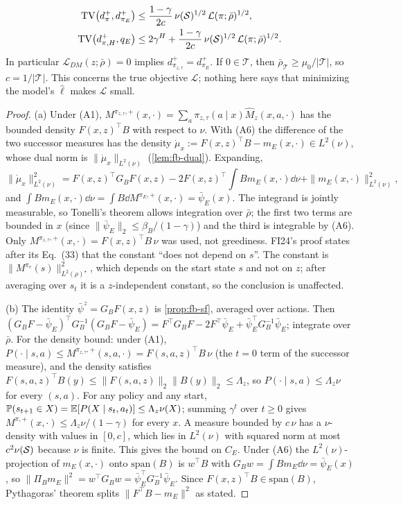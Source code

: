 \begin{theorem}
\begin{enumerate}[nosep,label=(\alph*)]
  \begin{align*}
  \mathrm{TV}\big(d^+_\pi,d^+_{\pi_E}\big)&\le\frac{1-\gamma}{2c}\,\nu(\mathcal{S})^{1/2}\,\mathcal L(\pi;\bar\rho)^{1/2},\\
  \mathrm{TV}\big(d^+_{\pi,H},q_E\big)&\le2\gamma^H+\frac{1-\gamma}{2c}\,\nu(\mathcal{S})^{1/2}\,\mathcal L(\pi;\bar\rho)^{1/2}.
  \end{align*}
  In particular $\mathcal L_{DM}(z;\bar\rho)=0$ implies $d^+_{\pi_{z,\tau}}=d^+_{\pi_E}$. If $0\in\mathcal T$, then $\bar\rho_{\mathcal T}\ge\mu_0/|\mathcal T|$, so $c=1/|\mathcal T|$.
  This concerns the true objective $\mathcal L$; nothing here says that minimizing the model's $\hat\ell$ makes $\mathcal L$ small.
\end{enumerate}
\end{theorem}
\begin{proof}
(a) Under (A1), $M^{\pi_{z,\tau},+}(x,\cdot)=\sum_a\pi_{z,\tau}(a\mid x)\hat M_z(x,a,\cdot)$ has the bounded density $F(x,z)^\top B$ with respect to $\nu$.
With (A6) the difference of the two successor measures has the density $\dot\mu_x:=F(x,z)^\top B-m_E(x,\cdot)\in L^2(\nu)$, whose dual norm is $\|\dot\mu_x\|_{L^2(\nu)}$ (\cref{lem:fb-dual}). Expanding,
\[
\|\dot\mu_x\|^2_{L^2(\nu)}=F(x,z)^\top G_BF(x,z)-2F(x,z)^\top\!\int Bm_E(x,\cdot)\dd\nu+\|m_E(x,\cdot)\|^2_{L^2(\nu)},
\]
and $\int Bm_E(x,\cdot)\dd\nu=\int B\dd M^{\pi_E,+}(x,\cdot)=\bar\psi_E(x)$.
The integrand is jointly measurable, so Tonelli's theorem allows integration over $\bar\rho$; the first two terms are bounded in $x$ (since $\|\bar\psi_E\|_2\le\beta_B/(1-\gamma)$) and the third is integrable by (A6).
Only $M^{\pi_{z,\tau},+}(x,\cdot)=F(x,z)^\top B\,\nu$ was used, not greediness.
FI24's proof states after its Eq.~(33) that the constant ``does not depend on $s$''. The constant is $\|M^{\pi_e}(s)\|^2_{L^2(\rho)^\star}$, which depends on the start state $s$ and not on $z$; after averaging over $s_t$ it is a $z$-independent constant, so the conclusion is unaffected.

(b) The identity $\bar\psi^{z}=G_BF(x,z)$ is \cref{prop:fb-sf}, averaged over actions. Then
$(G_BF-\bar\psi_E)^\top G_B^{-1}(G_BF-\bar\psi_E)=F^\top G_BF-2F^\top\bar\psi_E+\bar\psi_E^\top G_B^{-1}\bar\psi_E$; integrate over $\bar\rho$.
For the density bound: under (A1), $P(\cdot\mid s,a)\le M^{\pi_{z,\tau},+}(s,a,\cdot)=F(s,a,z)^\top B\,\nu$ (the $t=0$ term of the successor measure), and the density satisfies $F(s,a,z)^\top B(y)\le\|F(s,a,z)\|_2\|B(y)\|_2\le \Lambda_z$, so $P(\cdot\mid s,a)\le \Lambda_z\nu$ for every $(s,a)$.
For any policy and any start, $\mathbb{P}(s_{t+1}\in X)=\mathbb{E}[P(X\mid s_t,a_t)]\le \Lambda_z\nu(X)$; summing $\gamma^t$ over $t\ge0$ gives $M^{\pi,+}(x,\cdot)\le \Lambda_z\nu/(1-\gamma)$ for every $x$.
A measure bounded by $c\,\nu$ has a $\nu$-density with values in $[0,c]$, which lies in $L^2(\nu)$ with squared norm at most $c^2\nu(\mathcal{S})$ because $\nu$ is finite. This gives the bound on $C_E$.
Under (A6) the $L^2(\nu)$-projection of $m_E(x,\cdot)$ onto $\mathrm{span}(B)$ is $w^\top B$ with $G_Bw=\int Bm_E\dd\nu=\bar\psi_E(x)$, so $\|\Pi_Bm_E\|^2=w^\top G_Bw=\bar\psi_E^\top G_B^{-1}\bar\psi_E$.
Since $F(x,z)^\top B\in\mathrm{span}(B)$, Pythagoras' theorem splits $\|F^\top B-m_E\|^2$ as stated.


\end{proof}
